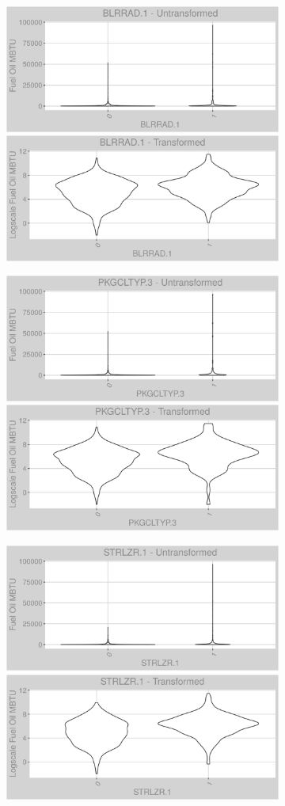 \FloatBarrier
\newpage
\begin{figure}
\centering
\begin{subfigure}{1\textwidth}
\centering
\includegraphics[width=.49\textwidth, height=0.3\textheight]{Images/fuel_oil_var_original_18.png}
\includegraphics[width=.49\textwidth, height=0.3\textheight]{Images/fuel_oil_var_transformed_18.png}
\end{subfigure}
\begin{subfigure}{1\textwidth}
\centering
\includegraphics[width=.49\textwidth, height=0.3\textheight]{Images/fuel_oil_var_original_19.png}
\includegraphics[width=.49\textwidth, height=0.3\textheight]{Images/fuel_oil_var_transformed_19.png}
\end{subfigure}
\begin{subfigure}{1\textwidth}
\centering
\includegraphics[width=.49\textwidth, height=0.3\textheight]{Images/fuel_oil_var_original_20.png}
\includegraphics[width=.49\textwidth, height=0.3\textheight]{Images/fuel_oil_var_transformed_20.png}
\end{subfigure}
\end{figure}